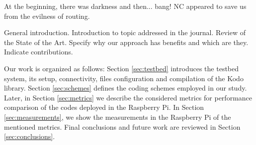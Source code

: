 At the beginning, there was darkness and then... bang! \ac{NC}
\cite{ahlswede2000network} appeared to save us from the evilness
of routing.

General introduction. Introduction to topic addressed in the journal.
Review of the State of the Art. Specify why our approach has benefits
and which are they. Indicate contributions.

Our work is organized as follows: Section \ref{sec:testbed} introduces
the testbed system, its setup, connectivity, files configuration and
compilation of the Kodo library. Section \ref{sec:schemes} defines the
coding schemes employed in our study. Later, in Section \ref{sec:metrics}
we describe the considered metrics for performance comparison of the
codes deployed in the Raspberry Pi. In Section \ref{sec:measurements}, we show
the measurements in the Raspberry Pi of the mentioned metrics. Final
conclusions and future work are reviewed in Section \ref{sec:conclusions}.


